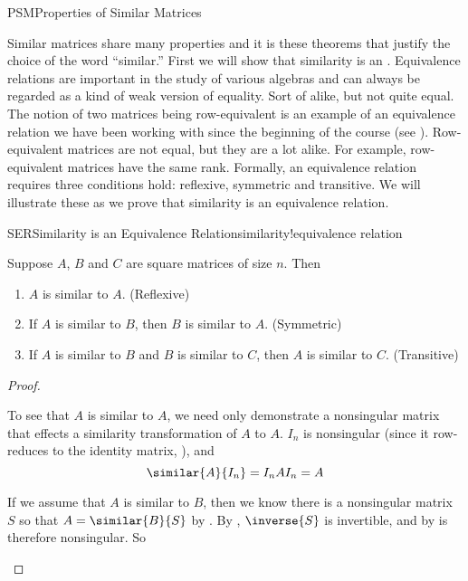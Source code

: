 \begin{subsect}{PSM}{Properties of Similar Matrices}
%
\begin{para}Similar matrices share many properties and it is these theorems that justify the choice of the word ``similar.''  First we will show that similarity is an .  Equivalence relations are important in the study of various algebras and can always be regarded as a kind of weak version of equality.  Sort of alike, but not quite equal.  The notion of two matrices being row-equivalent is an example of an equivalence relation we have been working with since the beginning of the course (see ).  Row-equivalent matrices are not equal, but they are a lot alike.  For example, row-equivalent matrices have the same rank.  Formally, an equivalence relation requires three conditions hold:  reflexive, symmetric and transitive.  We will illustrate these as we prove that similarity is an equivalence relation.\end{para}
%
\begin{theorem}{SER}{Similarity is an Equivalence Relation}{similarity!equivalence relation}
\begin{para}Suppose $A$, $B$ and $C$ are square matrices of size $n$.  Then
%
\begin{enumerate}
\item $A$ is similar to $A$.  (Reflexive)
\item If $A$ is similar to $B$, then $B$ is similar to $A$.  (Symmetric)
\item If $A$ is similar to $B$ and $B$ is similar to $C$, then $A$ is similar to $C$.  (Transitive)
\end{enumerate}
\end{para}
%
\end{theorem}
%
\begin{proof}
\begin{para}To see that $A$ is similar to $A$, we need only demonstrate a nonsingular matrix that effects a similarity transformation of $A$ to $A$.  $I_n$ is nonsingular (since it row-reduces to the identity matrix, ), and
%
\begin{equation*}
\similar{A}{I_n}=I_nAI_n=A
\end{equation*}\end{para}
%
\begin{para}If we assume that $A$ is similar to $B$, then we know there is a nonsingular matrix $S$ so that $A=\similar{B}{S}$ by .  By , $\inverse{S}$ is invertible, and by  is therefore nonsingular.  So

\end{para}
\end{proof}
\end{subsect}
